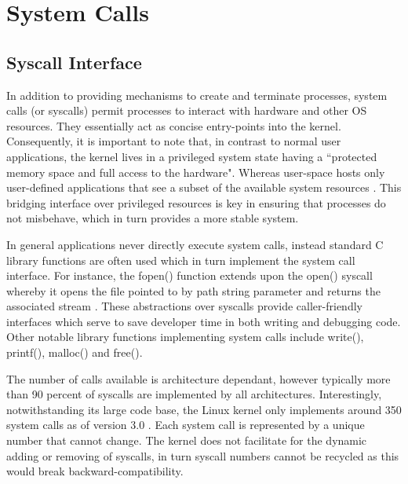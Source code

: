 \documentclass{article}
\begin{document}
\section{System Calls} 
\subsection{Syscall Interface}
In addition to providing mechanisms to create and terminate processes, 
system calls (or syscalls) permit processes to interact with hardware 
and other OS resources. They essentially act as concise entry-points into the kernel. 
Consequently, it is important to note that, in contrast to normal user applications, 
the kernel lives in a privileged system state having a ``protected memory space and full 
access to the hardware". Whereas user-space hosts only user-defined applications that see a subset 
of the available system resources \citep{Love}. This 
bridging interface over privileged resources
is key in ensuring that processes do not misbehave, which
in turn provides a more stable system.
\par
In general applications never directly execute system calls, instead
standard C library functions are often used which in turn implement
the system call interface. For instance, the fopen() function extends upon 
the open() syscall whereby it opens the file pointed to by path string parameter and returns the
associated stream \citep{Kerrisk}. These abstractions over syscalls provide caller-friendly interfaces 
which serve to save developer time in both writing and debugging code. Other notable 
library functions implementing system calls include write(), printf(), malloc() and free().
\par
The number of calls available is architecture dependant, 
however typically more than 90 percent of syscalls are implemented by all architectures. 
Interestingly, notwithstanding its large code base, the Linux kernel only implements around 350 system 
calls as of version 3.0 \citep{Love7}. Each system call is represented by a unique number that 
cannot change. The kernel does not facilitate for the dynamic adding or removing of syscalls, in
turn syscall numbers cannot be recycled as this would break backward-compatibility. 
\par
\end{document}
